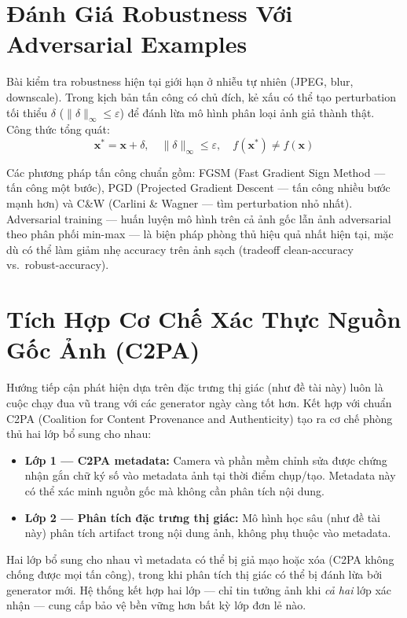 \section{Đánh Giá Robustness Với Adversarial Examples}

Bài kiểm tra robustness hiện tại giới hạn ở nhiễu tự nhiên (JPEG, blur, downscale). Trong kịch bản tấn công có chủ đích, kẻ xấu có thể tạo perturbation tối thiểu $\delta$ ($\|\delta\|_\infty \leq \varepsilon$) để đánh lừa mô hình phân loại ảnh giả thành thật. Công thức tổng quát:
\begin{equation}
  \mathbf{x}^* = \mathbf{x} + \delta, \quad \|\delta\|_\infty \leq \varepsilon, \quad f(\mathbf{x}^*) \neq f(\mathbf{x})
  \label{eq:adversarial}
\end{equation}

Các phương pháp tấn công chuẩn gồm: FGSM (Fast Gradient Sign Method --- tấn công một bước), PGD (Projected Gradient Descent --- tấn công nhiều bước mạnh hơn) và C\&W (Carlini \& Wagner --- tìm perturbation nhỏ nhất). Adversarial training --- huấn luyện mô hình trên cả ảnh gốc lẫn ảnh adversarial theo phân phối min-max --- là biện pháp phòng thủ hiệu quả nhất hiện tại, mặc dù có thể làm giảm nhẹ accuracy trên ảnh sạch (tradeoff clean-accuracy vs.\ robust-accuracy).

\section{Tích Hợp Cơ Chế Xác Thực Nguồn Gốc Ảnh (C2PA)}

Hướng tiếp cận phát hiện dựa trên đặc trưng thị giác (như đề tài này) luôn là cuộc chạy đua vũ trang với các generator ngày càng tốt hơn. Kết hợp với chuẩn C2PA (Coalition for Content Provenance and Authenticity) tạo ra cơ chế phòng thủ hai lớp bổ sung cho nhau:

\begin{itemize}
  \item \textbf{Lớp 1 --- C2PA metadata:} Camera và phần mềm chỉnh sửa được chứng nhận gắn chữ ký số vào metadata ảnh tại thời điểm chụp/tạo. Metadata này có thể xác minh nguồn gốc mà không cần phân tích nội dung.
  \item \textbf{Lớp 2 --- Phân tích đặc trưng thị giác:} Mô hình học sâu (như đề tài này) phân tích artifact trong nội dung ảnh, không phụ thuộc vào metadata.
\end{itemize}

Hai lớp bổ sung cho nhau vì metadata có thể bị giả mạo hoặc xóa (C2PA không chống được mọi tấn công), trong khi phân tích thị giác có thể bị đánh lừa bởi generator mới. Hệ thống kết hợp hai lớp --- chỉ tin tưởng ảnh khi \textit{cả hai} lớp xác nhận --- cung cấp bảo vệ bền vững hơn bất kỳ lớp đơn lẻ nào.
